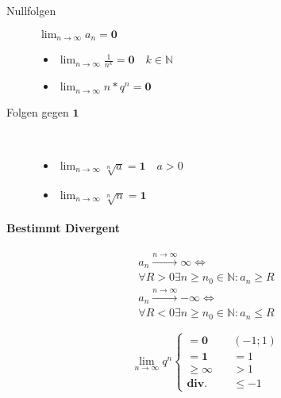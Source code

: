 \begin{description}
      \item [Nullfolgen] $\lim_{n \rightarrow \infty} a_n = \mathbf{0}$
            \begin{itemize}
                  \item  $\lim_{n \rightarrow \infty} \frac{1}{n^k} = \mathbf{0} \quad k \in \mathbb{N}$

                  \item $\lim_{n \rightarrow \infty} n * q^n = \mathbf{0}$
            \end{itemize}

            \item[Folgen gegen $\mathbf{1}$]\

            \begin{itemize}
                  \item $\lim_{n \rightarrow \infty} \sqrt[n]{a} = \mathbf{1} \quad a > 0$

                  \item $\lim_{n \rightarrow \infty} \sqrt[n]{n} = \mathbf{1}$
            \end{itemize}

\end{description}

\paragraph{Bestimmt Divergent}

\begin{gather*}
      a_n \xrightarrow{n \rightarrow \infty} \boldsymbol{\infty} \Leftrightarrow \\ \forall R \boldsymbol{>} 0 \exists n \geq n_0 \in \mathbb{N}: a_n \boldsymbol{\geq} R \\
      a_n \xrightarrow{n \rightarrow \infty} \boldsymbol{-\infty} \Leftrightarrow \\ \forall R \boldsymbol{<} 0 \exists n \geq n_0 \in \mathbb{N}: a_n \boldsymbol{\leq} R
\end{gather*}

$$
      \lim_{n \rightarrow \infty} q^n \begin{cases}
            = \mathbf{0} \quad         & (-1; 1) \\
            = \mathbf{1} \quad         & = 1     \\
            \geq \mathbf{\infty} \quad & > 1     \\
            \mathbf{\text{div.}} \quad & \leq -1
      \end{cases}
$$


